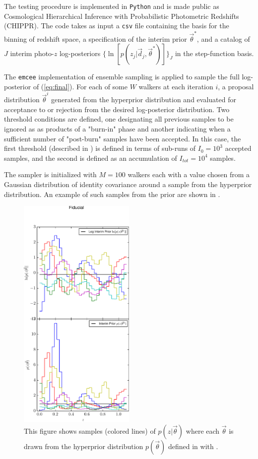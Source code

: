 The testing procedure is implemented in \texttt{Python} and is made public as Cosmological Hierarchical Inference with Probabilistic Photometric Redshifts (CHIPPR).  
The code takes as input a \texttt{csv} file containing the basis for the binning of redshift space, a specification of the interim prior $\vec{\theta}^{*}$, and a catalog of $J$ interim photo-$z$ log-posteriors $\{\ln[p(z_{j}|\vec{d}_{j},\vec{\theta}^{*})]\}_{J}$ in the step-function basis.

The \texttt{emcee} \citep{Foreman-Mackey2013} implementation of ensemble sampling is applied to sample the full log-posterior of (\ref{eq:final}).   
For each of some $W$ walkers at each iteration $i$, a proposal distribution $\vec{\theta}^{i}$ generated from the hyperprior distribution and evaluated for acceptance to or rejection from the desired log-posterior distribution.  
Two threshold conditions are defined, one designating all previous samples to be ignored as as products of a "burn-in" phase and another indicating when a sufficient number of "post-burn" samples have been accepted.  
In this case, the first threshold (described in ) is defined in terms of sub-runs of $I_{0}=10^{3}$ accepted samples, and the second is defined as an accumulation of $I_{tot}=10^{4}$ samples.

The sampler is initialized with $M=100$ walkers each with a value chosen from a Gaussian distribution of identity covariance around a sample from the hyperprior distribution.  
An example of such samples from the prior are shown in .

\begin{figure}
	\includegraphics[width=0.5\textwidth]{figures/chippr/null_priorsamps.pdf}
	\caption{This figure shows samples (colored lines) of $p(z|\vec{\theta})$ where each $\vec{\theta}$ is drawn from the hyperprior distribution $p(\vec{\theta})$ defined in  with .}
	\label{fig:prior}
\end{figure}


